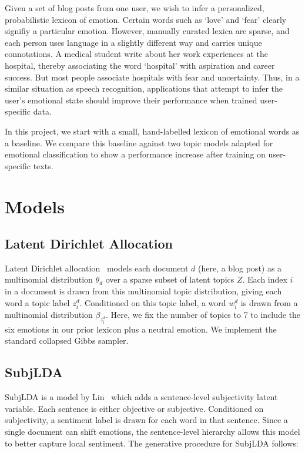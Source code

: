 \documentclass{article}
\begin{document}
Given a set of blog posts from one user, we wish to infer a
personalized, probabilistic lexicon of emotion. Certain words such
as `love' and `fear' clearly signifiy a particular emotion.  However,
manually curated lexica are sparse, and each person uses language
in a slightly different way and carries unique connotations. A
medical student write about her work experiences at the hospital,
thereby associating the word `hospital' with aspiration and career
success. But most people associate hospitals with fear and uncertainty.
Thus, in a similar situation as speech recognition, applications
that attempt to infer the user's emotional state should improve
their performance when trained user-specific data.

In this project, we start with a small, hand-labelled lexicon of
emotional words as a baseline. We compare this baseline against two
topic models adapted for emotional classification to show a performance
increase after training on user-specific texts.

\section{Models}
\subsection{Latent Dirichlet Allocation}
Latent Dirichlet allocation~\citep{blei03} models each document $d$
(here, a blog post) as a multinomial distribution $\theta_d$ over
a sparse subset of latent topics $Z$.  Each index $i$ in a document
is drawn from this multinomial topic distribution, giving each word
a topic label $z_i^d$. Conditioned on this topic label, a word
$w_i^d$ is drawn from a multinomial distribution $\beta_{z_i^d}$.
Here, we fix the number of topics to 7 to include the six emotions
in our prior lexicon plus a neutral emotion. We implement the
standard collapsed Gibbs sampler.

\subsection{SubjLDA} \label{sec:subjlda}
SubjLDA is a model by Lin~\citep{lin03} which adds a sentence-level
subjectivity latent variable. Each sentence is either objective or
subjective. Conditioned on subjectivity, a sentiment label is drawn
for each word in that sentence. Since a single document can shift
emotions, the sentence-level hierarchy allows this model to better
capture local sentiment. The generative procedure for SubjLDA
follows:
\end{document}
